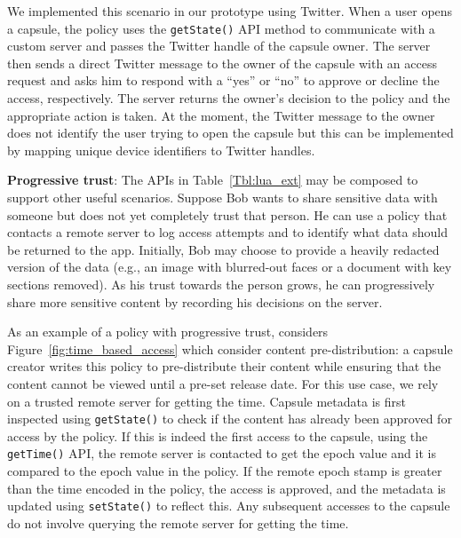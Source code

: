 We implemented this scenario in our prototype using Twitter. When a user opens a capsule,
the policy uses the \texttt{getState()} API method to communicate with a custom
server and passes the Twitter handle of the capsule owner. The server then sends
a direct Twitter message to the owner of the capsule with an access request
and asks him to respond with a ``yes'' or ``no'' to approve or decline the access,
respectively. The server returns the owner's decision to the policy and the
appropriate action is taken. At the moment, the Twitter message to the owner
does not identify the user trying to open the capsule but this can be
implemented by mapping unique device identifiers to Twitter handles.

\textbf{Progressive trust}: The APIs in Table~\ref{Tbl:lua_ext} may be composed
to support other useful scenarios. Suppose Bob wants to share
sensitive data with someone but does not yet completely trust that person. He
can use a policy that contacts a remote server to log access attempts and to
identify what data should be returned to the app. Initially, Bob may choose to
provide a heavily redacted version of the data (e.g., an image with blurred-out
faces or a document with key sections removed). As his trust towards
the person grows, he can progressively share more sensitive content by recording his
decisions on the server.


As an example of a policy with progressive trust, considers
Figure~\ref{fig:time_based_access} which consider content
pre-distribution: a capsule creator writes this policy to
pre-distribute their content while ensuring that the content cannot be
viewed until a pre-set release date. For this use case, we rely on a
trusted remote server for getting the time. Capsule metadata is first
inspected using \texttt{getState()} to check if the content has
already been approved for access by the policy. If this is indeed the
first access to the capsule, using the \texttt{getTime()} API, the
remote server is contacted to get the epoch value and it is compared
to the epoch value in the policy. If the remote epoch stamp is greater
than the time encoded in the policy, the access is approved, and the
metadata is updated using \texttt{setState()} to reflect this. Any
subsequent accesses to the capsule do not involve querying the remote
server for getting the time.

